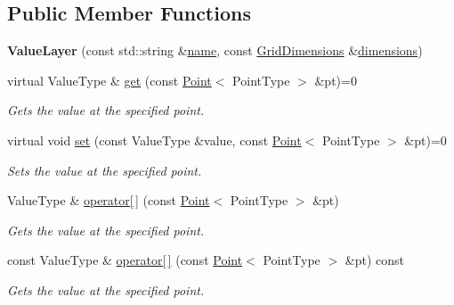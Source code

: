 \subsection*{Public Member Functions}
\begin{DoxyCompactItemize}
\item 
\hypertarget{classrepast_1_1_value_layer_a5cf943b36cd95a9df924c68108e38509}{{\bfseries Value\-Layer} (const std\-::string \&\hyperlink{classrepast_1_1_base_value_layer_a27277765ee50f9d5446b253f77797f5c}{name}, const \hyperlink{classrepast_1_1_grid_dimensions}{Grid\-Dimensions} \&\hyperlink{classrepast_1_1_value_layer_a51fe7fe718305d0c006bc465a14ef0e3}{dimensions})}\label{classrepast_1_1_value_layer_a5cf943b36cd95a9df924c68108e38509}

\item 
virtual Value\-Type \& \hyperlink{classrepast_1_1_value_layer_a472a2fcaa29b30c6410ec29b1cde34c0}{get} (const \hyperlink{classrepast_1_1_point}{Point}$<$ Point\-Type $>$ \&pt)=0
\begin{DoxyCompactList}\small\item\em Gets the value at the specified point. \end{DoxyCompactList}\item 
virtual void \hyperlink{classrepast_1_1_value_layer_a34ab3f83380ca978f19748cff9361425}{set} (const Value\-Type \&value, const \hyperlink{classrepast_1_1_point}{Point}$<$ Point\-Type $>$ \&pt)=0
\begin{DoxyCompactList}\small\item\em Sets the value at the specified point. \end{DoxyCompactList}\item 
Value\-Type \& \hyperlink{classrepast_1_1_value_layer_a4d48fb5bc3219f8c0a1e7572fd97c0ab}{operator\mbox{[}$\,$\mbox{]}} (const \hyperlink{classrepast_1_1_point}{Point}$<$ Point\-Type $>$ \&pt)
\begin{DoxyCompactList}\small\item\em Gets the value at the specified point. \end{DoxyCompactList}\item 
const Value\-Type \& \hyperlink{classrepast_1_1_value_layer_aa2cb696a1be3cc9216936c1d57e494b6}{operator\mbox{[}$\,$\mbox{]}} (const \hyperlink{classrepast_1_1_point}{Point}$<$ Point\-Type $>$ \&pt) const 
\begin{DoxyCompactList}\small\item\em Gets the value at the specified point. \end{DoxyCompactList}\item 

\end{DoxyCompactItemize}
